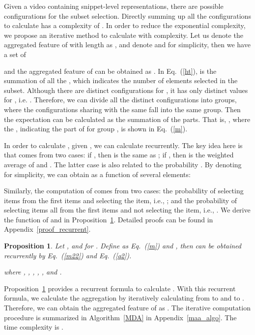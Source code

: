 \documentclass{article} \usepackage{iclr2019_conference,times}
\newtheorem{proposition}{Proposition}
\begin{document}
Given a video containing  snippet-level representations, there are  possible configurations for the subset selection. Directly summing up all the  configurations 
to calculate  has a complexity of  . In order to reduce the exponential complexity, we propose an iterative method to calculate  with  complexity. Let us denote the aggregated feature of  with length  as , and denote  and  for simplicity, then we have a set of

 and the aggregated feature of  can be obtained as .  In Eq.~(\ref{ht}),   is the summation of all the , which indicates the number of elements selected in the subset. Although there are  distinct configurations for , it has only  distinct values for , i.e. . Therefore, we can divide all the  distinct configurations into  groups, where the configurations sharing with the same  fall into the same group. Then the expectation  can be calculated as the summation of the  parts. That is, , where the , indicating the  part of  for group , is shown in Eq.~(\ref{m}).

In order to calculate , given , we can calculate  recurrently. The key idea here is that  comes from two cases: if , then  is the same as ; if , then  is the weighted average of  and . The latter case is also related to the probability . By denoting  for simplicity, we can obtain  as a function of several elements:  

Similarly, the computation of  comes from two cases: the probability of selecting  items from the first  items and selecting the  item, i.e., ; and the probability of selecting  items all from the first  items and not selecting the  item, i.e., . 
We derive the function of  and  in Proposition~\ref{recurrent}. Detailed proofs can be found in Appendix~\ref{proof_recurrent}.
\begin{proposition}
\label{recurrent}
Let   ,  and  for . Define  as Eq.~(\ref{m}) and , then  can be obtained recurrently by Eq.~(\ref{m22}) and Eq.~(\ref{q2}).  

where , , , , , and .

\end{proposition}
Proposition~\ref{recurrent} provides a recurrent formula to calculate . With this recurrent formula, we calculate the aggregation  by iteratively calculating  from  to  and  to . Therefore, we can obtain the aggregated feature of  as . The iterative computation procedure is summarized in Algorithm~\ref{MDA} in Appendix~\ref{maa_algo}. The time complexity is .
\end{document}
